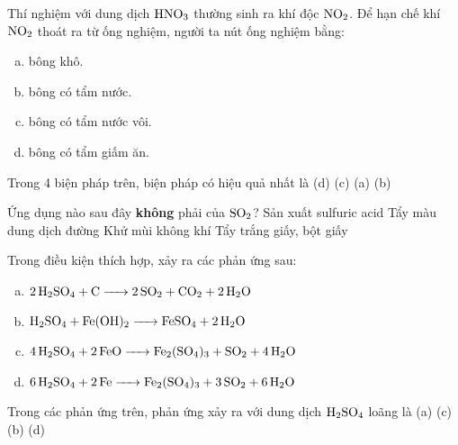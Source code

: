 \documentclass[12pt,a4paper]{article}
\begin{document}
\begin{ex}
Thí nghiệm với dung dịch $\ce{HNO3}$ thường sinh ra khí độc $\ce{NO2}$. Để hạn chế khí $\ce{NO2}$ thoát ra từ ống nghiệm, người ta nút ống nghiệm bằng:
\begin{enumerate}[(a)]
	\item bông khô.
	\item bông có tẩm nước.
	\item bông có tẩm nước vôi.
	\item bông có tẩm giấm ăn.
\end{enumerate}
Trong 4 biện pháp trên, biện pháp có hiệu quả nhất là
\choice
{(d)}
{\True (c)}
{(a)}
{(b)}

\end{ex}

\begin{ex}
Ứng dụng nào sau đây \textbf{không} phải của $\ce{SO2}$?
\choice
{Sản xuất sulfuric acid}
{Tẩy màu dung dịch đường}
{\True Khử mùi không khí}
{Tẩy trắng giấy, bột giấy}

\end{ex}

\begin{ex}
Trong điều kiện thích hợp, xảy ra các phản ứng sau:
\begin{enumerate}[(a)]
	\item $\ce{2H2SO4 + C -> 2SO2 + CO2 + 2H2O}$
	\item $\ce{H2SO4 + Fe(OH)2 -> FeSO4 + 2H2O}$
	\item $\ce{4H2SO4 + 2FeO -> Fe2(SO4)3 + SO2 + 4H2O}$
	\item $\ce{6H2SO4 + 2Fe -> Fe2(SO4)3 + 3SO2 + 6H2O}$
\end{enumerate}
Trong các phản ứng trên, phản ứng xảy ra với dung dịch $\ce{H2SO4}$ loãng là
\choice
{(a)}
{(c)}
{\True (b)}
{(d)}

\end{ex}
\end{document}
